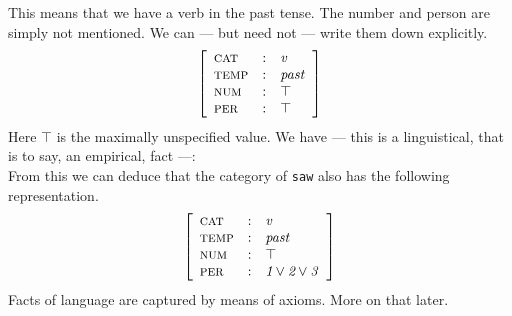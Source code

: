 This means that we have a verb in the past tense. The number and
person are simply not mentioned.  We can --- but need not --- write
them down explicitly.
\begin{equation}
\left[\begin{array}{l@{\quad : \quad}l}
\mbox{\sc cat} & \mbox{\it v} \\
\mbox{\sc temp} & \mbox{\it past\/} \\
\mbox{\sc num} & \top \\
\mbox{\sc per} & \top
\end{array}\right]
\end{equation}
Here $\top$ is the maximally unspecified value. We have ---
this is a linguistical, that is to say, an empirical, fact ---:
\begin{equation}
[\mbox{\sc per} : \mbox{\it 1} \oder \mbox{\it 2} \oder \mbox{\it 3\/}]
\end{equation}
From this we can deduce that the category of {\tt saw} also has 
the following representation.
\begin{equation}
\left[\begin{array}{l@{\quad : \quad}l}
\mbox{\sc cat} & \mbox{\it v} \\
\mbox{\sc temp} & \mbox{\it past\/} \\
\mbox{\sc num} & \top \\
\mbox{\sc per} & \mbox{\it 1} \oder \mbox{\it 2} \oder
    \mbox{\it 3\/}
\end{array}\right]
\end{equation}
Facts of language are captured by means of axioms. More on that later.

